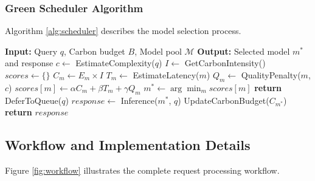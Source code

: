 \documentclass[conference]{IEEEtran}
\begin{document}
\subsubsection{Green Scheduler Algorithm}

Algorithm \ref{alg:scheduler} describes the model selection process.

\begin{algorithm}[h]
\caption{Green Scheduler}
\label{alg:scheduler}
\begin{algorithmic}[1]
\STATE \textbf{Input:} Query $q$, Carbon budget $B$, Model pool $\mathcal{M}$
\STATE \textbf{Output:} Selected model $m^*$ and response
\STATE $c \leftarrow$ EstimateComplexity($q$)
\STATE $I \leftarrow$ GetCarbonIntensity()
\STATE $scores \leftarrow \{\}$
    \STATE $C_m \leftarrow E_m \times I$ 
    \STATE $T_m \leftarrow$ EstimateLatency($m$)
    \STATE $Q_m \leftarrow$ QualityPenalty($m$, $c$)
    \STATE $scores[m] \leftarrow \alpha C_m + \beta T_m + \gamma Q_m$
\ENDFOR
\STATE $m^* \leftarrow \arg\min_{m} scores[m]$
    \STATE \textbf{return} DeferToQueue($q$)
\ENDIF
\STATE $response \leftarrow$ Inference($m^*$, $q$)
\STATE UpdateCarbonBudget($C_{m^*}$)
\STATE \textbf{return} $response$
\end{algorithmic}
\end{algorithm}

\subsection{Workflow and Implementation Details}

Figure \ref{fig:workflow} illustrates the complete request processing workflow.
\end{document}
